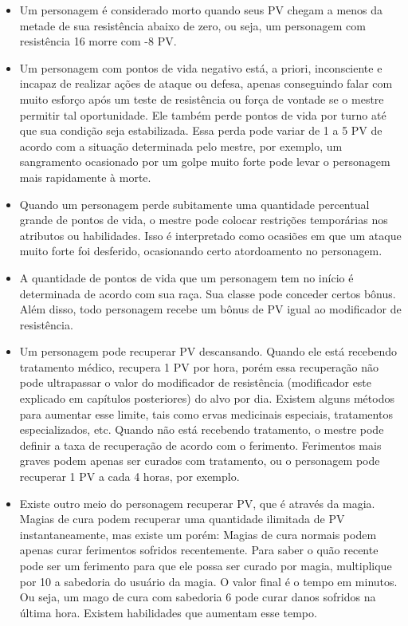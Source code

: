 \begin{itemize}
\begin{itemize}
\item Um personagem é considerado morto quando seus PV chegam a menos da metade de sua resistência abaixo de zero, ou seja, um personagem com resistência 16 morre com -8 PV. 
\item Um personagem com pontos de vida negativo está, a priori, inconsciente e incapaz de realizar ações de ataque ou defesa, apenas conseguindo falar com muito esforço após um teste de resistência ou força de vontade se o mestre permitir tal oportunidade. Ele também perde pontos de vida por turno até que sua condição seja estabilizada. Essa perda pode variar de 1 a 5 PV de acordo com a situação determinada pelo mestre, por exemplo, um sangramento ocasionado por um golpe muito forte pode levar o personagem mais rapidamente à morte. 
\item Quando um personagem perde subitamente uma quantidade percentual grande de pontos de vida, o mestre pode colocar restrições temporárias nos atributos ou habilidades. Isso é interpretado como ocasiões em que um ataque muito forte foi desferido, ocasionando certo atordoamento no personagem.
\item A quantidade de pontos de vida que um personagem tem no início é determinada de acordo com sua raça. Sua classe pode conceder certos bônus. Além disso, todo personagem recebe um bônus de PV igual ao modificador de resistência.
\item Um personagem pode recuperar PV descansando. Quando ele está recebendo tratamento médico, recupera 1 PV por hora, porém essa recuperação não pode ultrapassar o valor do modificador de resistência (modificador este explicado em capítulos posteriores) do alvo por dia. Existem alguns métodos para aumentar esse limite, tais como ervas medicinais especiais, tratamentos especializados, etc. Quando não está recebendo tratamento, o mestre pode definir a taxa de recuperação de acordo com o ferimento. Ferimentos mais graves podem apenas ser curados com tratamento, ou o personagem pode recuperar 1 PV a cada 4 horas, por exemplo.
\item Existe outro meio do personagem recuperar PV, que é através da magia. Magias de cura podem recuperar uma quantidade ilimitada de PV instantaneamente, mas existe um porém: Magias de cura normais podem apenas curar ferimentos sofridos recentemente. Para saber o quão recente pode ser um ferimento para que ele possa ser curado por magia, multiplique por 10 a sabedoria do usuário da magia. O valor final é o tempo em minutos. Ou seja, um mago de cura com sabedoria 6 pode curar danos sofridos na última hora. Existem habilidades que aumentam esse tempo. 

\end{itemize}
\end{itemize}
